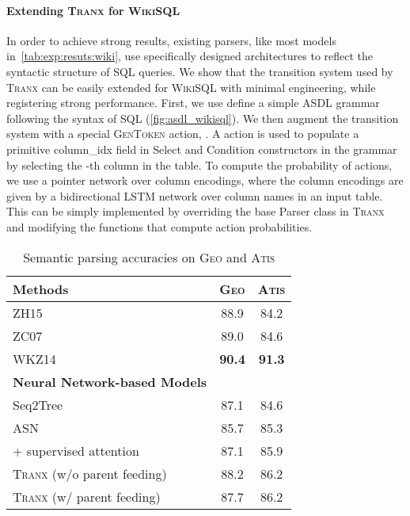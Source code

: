 \documentclass[11pt,a4paper]{article}
\renewcommand{\tt}[1]{\fontfamily{cmtt}\selectfont #1}
\def\model/{\textsc{Tranx}}
\def\atis/{\textsc{Atis}}
\def\wikisql/{\textsc{WikiSQL}}
\def\geo/{\textsc{Geo}}
\def\sq/{{\sc Seq2Tree}}
\begin{document}
\paragraph{Extending \model/ for \wikisql/} 
In order to achieve strong results, existing parsers, like most models in~\autoref{tab:exp:resuts:wiki}, use specifically designed architectures to reflect the syntactic structure of SQL queries.
We show that the transition system used by \model/ can be easily extended for \wikisql/ with minimal engineering, while registering strong performance.
First, we use define a simple ASDL grammar following the syntax of SQL (\autoref{fig:asdl_wikisql}).
We then augment the transition system with a special \textsc{GenToken} action, . 
A  action is used to populate a primitive {\tt column\_idx} field in {\tt Select} and {\tt Condition} constructors in the grammar by selecting the -th column in the table.
To compute the probability of  actions, we use a pointer network over column encodings, where the column encodings are given by a bidirectional LSTM network over column names in an input table. 
This can be simply implemented by overriding the base {\tt Parser} class in \model/ and modifying the functions that compute action probabilities.


\begin{table}[tb]
\small
  \centering
  \begin{tabular}{lcc}
  \hline

  \hline
  \textbf{Methods} & \textbf{\geo/} & \textbf{\atis/} \\
  \hline
    ZH15 \citep{zhao15type} & 88.9 & 84.2 \\
    ZC07 \citep{DBLP:dblp_conf/emnlp/ZettlemoyerC07} & 89.0 & 84.6 \\
    WKZ14 \citep{wang-kwiatkowski-zettlemoyer:2014:EMNLP2014} & {\bf 90.4} & {\bf 91.3} \\ \hline

    \hline
    \textbf{Neural Network-based Models} \\
    \sq/ \citep{DBLP:conf/acl/DongL16} & 87.1 & 84.6 \\
    ASN \citep{rabinovich17syntaxnet}  & 85.7 & 85.3 \\
    \quad\quad + supervised attention  &  87.1 & 85.9 \\
  \hline 
    \model/ (w/o parent feeding) & 88.2 & 86.2 \\
    \model/ (w/ parent feeding) & 87.7 & 86.2 \\

  \hline

  \hline
  \end{tabular}
  \caption{Semantic parsing accuracies on \geo/ and \atis/}
  \label{tab:exp:resuts:sp}
  \vspace{-2mm}
\end{table}
\end{document}
